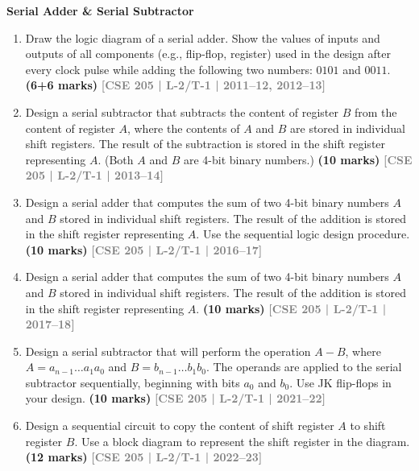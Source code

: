 \documentclass[12pt,a4paper]{article}
\newcommand{\yr}[1]{\hfill\textcolor{gray}{\small\textbf{[#1]}}}
\newcommand{\mk}[1]{\textcolor{orange!70!black}{\small\textbf{(#1 marks)}}}
\newcommand{\subtopic}[2]{%
  \vspace{10pt}
  \noindent\begin{tcolorbox}[colback=#1!8,colframe=#1,boxrule=0.6pt,arc=4pt,
    left=6pt,right=6pt,top=4pt,bottom=4pt]
    \small\bfseries\textcolor{#1}{#2}
  \end{tcolorbox}
  \vspace{2pt}
}
\begin{document}
\subtopic{cG}{Serial Adder \& Serial Subtractor}
\label{sub:s7-serial}

\begin{enumerate}

\item Draw the logic diagram of a serial adder. Show the values of inputs and outputs of all components (e.g., flip-flop, register) used in the design after every clock pulse while adding the following two numbers: $0101$ and $0011$.
\mk{6+6} \yr{CSE 205 | L-2/T-1 | 2011--12, 2012--13}

\item Design a serial subtractor that subtracts the content of register $B$ from the content of register $A$, where the contents of $A$ and $B$ are stored in individual shift registers. The result of the subtraction is stored in the shift register representing $A$. (Both $A$ and $B$ are 4-bit binary numbers.)
\mk{10} \yr{CSE 205 | L-2/T-1 | 2013--14}


\item Design a serial adder that computes the sum of two 4-bit binary numbers $A$ and $B$ stored in individual shift registers. The result of the addition is stored in the shift register representing $A$. Use the sequential logic design procedure.
\mk{10} \yr{CSE 205 | L-2/T-1 | 2016--17}

\item Design a serial adder that computes the sum of two 4-bit binary numbers $A$ and $B$ stored in individual shift registers. The result of the addition is stored in the shift register representing $A$.
\mk{10} \yr{CSE 205 | L-2/T-1 | 2017--18}

\item Design a serial subtractor that will perform the operation $A - B$, where $A = a_{n-1}\ldots a_1 a_0$ and $B = b_{n-1}\ldots b_1 b_0$. The operands are applied to the serial subtractor sequentially, beginning with bits $a_0$ and $b_0$. Use JK flip-flops in your design.
\mk{10} \yr{CSE 205 | L-2/T-1 | 2021--22}

\item Design a sequential circuit to copy the content of shift register $A$ to shift register $B$. Use a block diagram to represent the shift register in the diagram.
\mk{12} \yr{CSE 205 | L-2/T-1 | 2022--23}


\end{enumerate}
\end{document}
